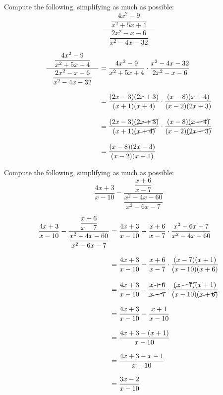 \documentclass[11pt,letterpaper]{article}
\begin{document}
\newpage



 Compute the following, simplifying as much as possible:
	\[
	\dfrac{\phantom{.}\;\;\;\dfrac{4x^2 - 9}{x^2 + 5x + 4}\;\;\;\phantom{.}}{\dfrac{2x^2 - x - 6}{x^2 - 4x - 32}}
	\] \pspace

\sol
	\[
	\begin{aligned}
	\dfrac{\phantom{.}\;\;\;\dfrac{4x^2 - 9}{x^2 + 5x + 4}\;\;\;\phantom{.}}{\dfrac{2x^2 - x - 6}{x^2 - 4x - 32}}&= \dfrac{4x^2 - 9}{x^2 + 5x + 4} \cdot \dfrac{x^2 - 4x - 32}{2x^2 - x - 6} \\[0.3cm]
	&= \dfrac{(2x - 3)(2x + 3)}{(x + 1)(x + 4)} \cdot \dfrac{(x - 8)(x + 4)}{(x - 2)(2x + 3)} \\[0.3cm]
	&= \dfrac{(2x - 3)\cancel{(2x + 3)}}{(x + 1)\cancel{(x + 4)}} \cdot \dfrac{(x - 8)\cancel{(x + 4)}}{(x - 2)\cancel{(2x + 3)}} \\[0.3cm]
	&= \dfrac{(x - 8)(2x - 3)}{(x - 2)(x + 1)} 
	\end{aligned}
	\]



\newpage



 Compute the following, simplifying as much as possible:
	\[
	\dfrac{4x + 3}{x - 10} - \dfrac{\phantom{.}\;\;\;\dfrac{x + 6}{x - 7}\;\;\;\phantom{.}}{\dfrac{x^2 - 4x - 60}{x^2 - 6x - 7}}
	\] \pspace

\sol
	\[
	\begin{aligned}
	\dfrac{4x + 3}{x - 10} - \dfrac{\phantom{.}\;\;\;\dfrac{x + 6}{x - 7}\;\;\;\phantom{.}}{\dfrac{x^2 - 4x - 60}{x^2 - 6x - 7}}&= \dfrac{4x + 3}{x - 10} - \dfrac{x + 6}{x - 7} \cdot \dfrac{x^2 - 6x - 7}{x^2 - 4x - 60} \\[0.3cm]
	&= \dfrac{4x + 3}{x - 10} - \dfrac{x + 6}{x - 7} \cdot \dfrac{(x - 7)(x + 1)}{(x - 10)(x + 6)} \\[0.3cm]
	&= \dfrac{4x + 3}{x - 10} - \dfrac{\cancel{x + 6}}{\cancel{x - 7}} \cdot \dfrac{\cancel{(x - 7)}(x + 1)}{(x - 10)\cancel{(x + 6)}} \\[0.3cm] 
	&= \dfrac{4x + 3}{x - 10} - \dfrac{x + 1}{x - 10} \\[0.3cm]
	&= \dfrac{4x + 3 - (x + 1)}{x - 10} \\[0.3cm]
	&= \dfrac{4x + 3 - x - 1}{x - 10} \\[0.3cm]
	&= \dfrac{3x - 2}{x - 10}
	\end{aligned}
	\]
\end{document}
